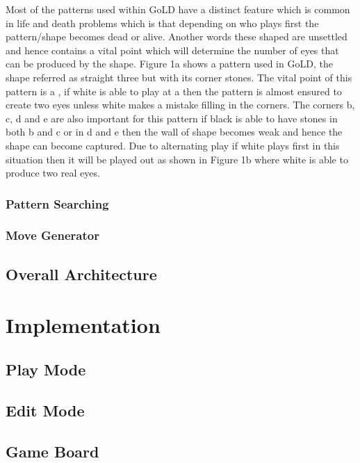 \documentclass{l4proj}
\begin{document}
Most of the patterns used within GoLD have a distinct feature which is common in life and death problems which is that depending on who plays first the pattern/shape becomes dead or alive. Another words these shaped are unsettled and hence contains a vital point which will determine the number of eyes that can be produced by the shape. Figure 1a shows a pattern used in GoLD, the shape referred as straight three but with its corner stones. The vital point of this pattern is a , if white is able to play at a then the pattern is almost ensured to create two eyes unless white makes a mistake filling in the corners. The corners b, c, d and e are also important for this pattern if black is able to have stones in both b and c  or in d and e then the wall of shape becomes weak and hence the shape can become captured. Due to alternating play if white plays first in this situation then it will be played out as shown in Figure 1b where white is able to produce two real eyes.



\subsection{Pattern Searching}


\subsection{Move Generator}



\section{Overall Architecture}




\chapter{Implementation}

\section{Play Mode}

\section{Edit Mode}

\section{Game Board}
\end{document}
